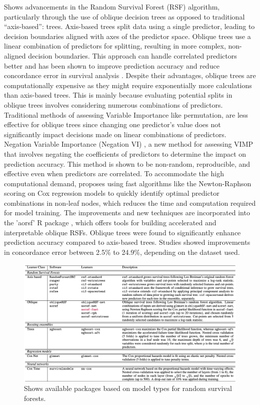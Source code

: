 \par \noindent \parencite{jaeger_accelerated_2022} Shows advancements in the Random Survival Forest (RSF) algorithm, particularly through the use of oblique decision trees as opposed to traditional “axis-based”: trees. \parencite{jaeger_accelerated_2022} Axis-based trees split data using a single predictor, leading to decision boundaries aligned with axes of the predictor space. Oblique trees use a linear combination of predictors for splitting, resulting in more complex, non-aligned decision boundaries. This approach can handle correlated predictors better and has been shown to improve prediction accuracy and reduce concordance error in survival analysis \parencite{jaeger_accelerated_2022}. Despite their advantages, oblique trees are computationally expensive as they might require exponentially more calculations than axis-based trees. This is mainly because evaluating potential splits in oblique trees involves considering numerous combinations of predictors. Traditional methods of assessing Variable Importance \parencite{pham_springer_2023} like permutation, are less effective for oblique trees since changing one predictor's value does not significantly impact decisions made on linear combinations of predictors. Negation Variable Importance (Negation VI) \parencite{jaeger_accelerated_2022}, a new method for assessing VIMP that involves negating the coefficients of predictors to determine the impact on prediction accuracy. This method is shown to be non-random, reproducible, and effective even when predictors are correlated. To accommodate the high computational demand, \parencite{jaeger_accelerated_2022} proposes using fast algorithms like the Newton-Raphson scoring on Cox regression models to quickly identify optimal predictor combinations in non-leaf nodes, which reduces the time and computation required for model training. The improvements and new techniques are incorporated into the 'aorsf' R package \parencite{jaeger_accelerated_2022}, which offers tools for building accelerated and interpretable oblique RSFs. Oblique trees were found to significantly enhance prediction accuracy compared to axis-based trees. Studies showed improvements in concordance error between 2.5\% to 24.9\%, depending on the dataset used.

\begin{figure}
    \includegraphics[scale=0.42]{Figures/OBLIQUE_SUMMARY.png}
    \caption{\parencite{jaeger_accelerated_2022} Shows available packages based on model types for random survival forests.}
\end{figure}


